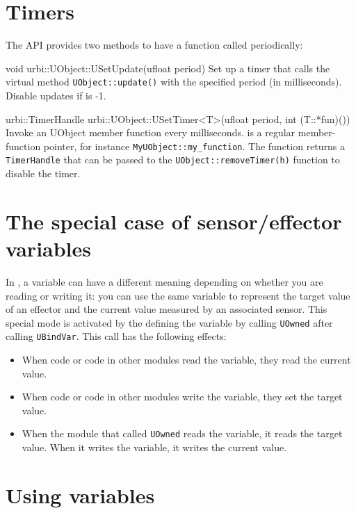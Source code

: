 \section{Timers}
\label{sec:uob:timers}

The API provides two methods to have a function called periodically:
\begin{cxxapi}
\item[void urbi::UObject::USetUpdate(ufloat period)]
  Set up a timer that calls the virtual method
  \lstinline{UObject::update()} with the specified period (in
  milliseconds).  Disable updates if  is -1.

\item[urbi::TimerHandle urbi::UObject::USetTimer<T>(ufloat period, int (T::*fun)())]
  Invoke an UObject member function  every 
  milliseconds.   is a regular member-function pointer, for
  instance \lstinline|MyUObject::my_function|.
  The function returns a \lstinline|TimerHandle| that can be passed to the
  \lstinline|UObject::removeTimer(h)| function to disable the timer.
\end{cxxapi}

\section{The special case of sensor/effector variables}

In \urbi, a variable can have a different meaning depending on whether
you are reading or writing it: you can use the same variable to
represent the target value of an effector and the current value
measured by an associated sensor. This special mode is activated by
the \UObject defining the variable by calling
\lstinline{UOwned} after calling \lstinline{UBindVar}. This call has
the following effects:
\begin{itemize}
\item When \urbi code or code in other modules read the variable, they
  read the current value.
\item When \urbi code or code in other modules write the variable,
  they set the target value.
\item When the module that called \lstinline|UOwned| reads the
  variable, it reads the target value. When it writes the variable, it
  writes the current value.
\end{itemize}

\section{Using \urbi variables}

